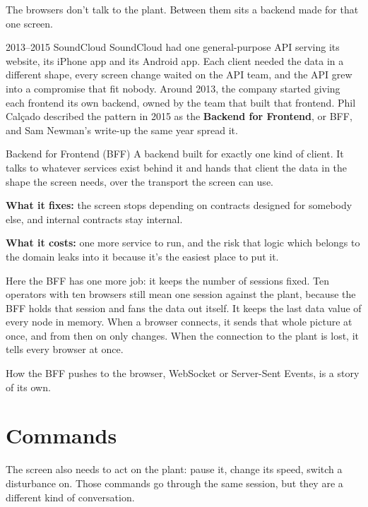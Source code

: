 The browsers don't talk to the plant. Between them sits a backend made for that
one screen.

\begin{history}{2013--2015 \textperiodcentered{} SoundCloud}
SoundCloud had one general-purpose API serving its website, its iPhone app and
its Android app. Each client needed the data in a different shape, every screen
change waited on the API team, and the API grew into a compromise that fit
nobody. Around 2013, the company started giving each frontend its own backend,
owned by the team that built that frontend. Phil Calçado described the pattern
in 2015 as the \textbf{Backend for Frontend}, or BFF, and Sam Newman's write-up
the same year spread it.
\end{history}

\begin{concept}{Backend for Frontend (BFF)}
A backend built for exactly one kind of client. It talks to whatever services
exist behind it and hands that client the data in the shape the screen needs,
over the transport the screen can use.

\textbf{What it fixes:} the screen stops depending on contracts designed for
somebody else, and internal contracts stay internal.

\textbf{What it costs:} one more service to run, and the risk that logic which
belongs to the domain leaks into it because it's the easiest place to put it.
\end{concept}

Here the BFF has one more job: it keeps the number of sessions fixed. Ten
operators with ten browsers still mean one session against the plant, because
the BFF holds that session and fans the data out itself. It keeps the last data
value of every node in memory. When a browser connects, it sends that whole
picture at once, and from then on only changes. When the connection to the
plant is lost, it tells every browser at once.

How the BFF pushes to the browser, WebSocket or Server-Sent Events, is a story
of its own.

\section{Commands}

The screen also needs to act on the plant: pause it, change its speed, switch a
disturbance on. Those commands go through the same session, but they are a
different kind of conversation.

